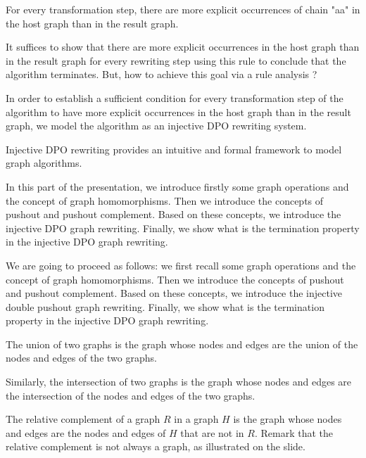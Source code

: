        For every transformation step, there are more explicit occurrences of chain "aa" in the host graph than in the result graph. 

        It suffices to show that there are more explicit occurrences in the host graph than in the result graph for every rewriting step using this rule to conclude that the algorithm terminates. But, how to achieve this goal via a rule analysis ?

    In order to establish a sufficient condition for every transformation step of the algorithm to have more explicit occurrences in the host graph than in the result graph, we model the algorithm as an injective DPO rewriting system.
    
    Injective DPO rewriting provides an intuitive and formal framework to model graph algorithms. 

    In this part of the presentation, we introduce firstly some graph operations and the concept of graph homomorphisms. Then we introduce the concepts of pushout and pushout complement. Based on these concepts, we introduce the injective DPO graph rewriting. Finally, we show what is the termination property in the injective DPO graph rewriting.

    We are going to proceed as follows: we first recall some graph operations and the concept of graph homomorphisms. Then we introduce the concepts of pushout and pushout complement. Based on these concepts, we introduce the injective double pushout graph rewriting. Finally, we show what is the termination property in the injective DPO graph rewriting.


    The union of two graphs is the graph whose nodes and edges are the union of the nodes and edges of the two graphs. 
        
    Similarly, the intersection of two graphs is the graph whose nodes and edges are the intersection of the nodes and edges of the two graphs.
        
    The relative complement of a graph $R$ in a graph $H$ is the graph whose nodes and edges are the nodes and edges of $H$ that are not in $R$.
    Remark that the relative complement is not always a graph, as illustrated on the slide.


